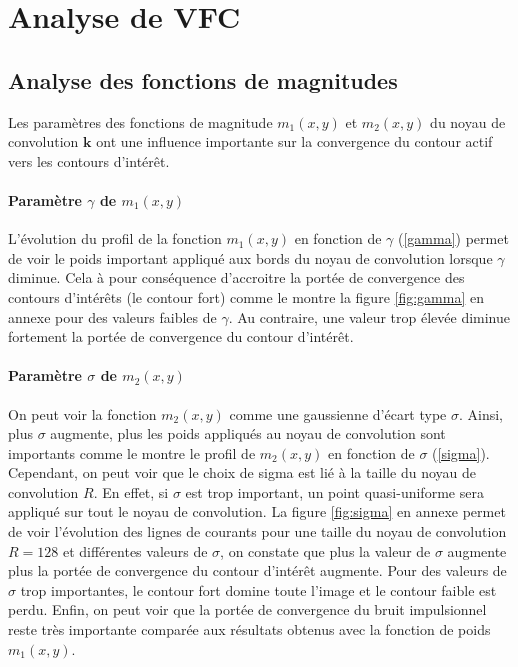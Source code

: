 
\section{Analyse de VFC}
\subsection{Analyse des fonctions de magnitudes}
Les paramètres des fonctions de magnitude $m_1(x,y)$ et $m_2(x,y)$ du noyau de convolution $\mathbf{k}$ ont une influence importante sur la convergence du contour actif vers les contours d'intérêt.

\paragraph*{Paramètre $\gamma$ de $m_1(x,y)$}
L'évolution du profil de la fonction $m_1(x,y)$ en fonction de $\gamma$ (\ref{gamma}) permet de voir le poids important appliqué aux bords du noyau de convolution lorsque $\gamma$ diminue. Cela à pour conséquence d'accroitre la portée de convergence des contours d'intérêts (le contour fort) comme le montre la figure \ref{fig:gamma} en annexe pour des valeurs faibles de $\gamma$. Au contraire, une valeur trop élevée diminue fortement la portée de convergence du contour d'intérêt. 

\paragraph*{Paramètre $\sigma$ de $m_2(x,y)$}
On peut voir la fonction $m_2(x,y)$ comme une gaussienne d'écart type $\sigma$. Ainsi, plus $\sigma$ augmente, plus les poids appliqués au noyau de convolution sont importants comme le montre le profil de $m_2(x,y)$ en fonction de $\sigma$ (\ref{sigma}). Cependant, on peut voir que le choix de sigma est lié à la taille du noyau de convolution $R$. En effet, si $\sigma$ est trop important, un point quasi-uniforme sera appliqué sur tout le noyau de convolution. La figure \ref{fig:sigma} en annexe permet de voir l'évolution des lignes de courants pour une taille du noyau de convolution $R=128$ et différentes valeurs de $\sigma$, on constate que plus la valeur de $\sigma$ augmente plus la portée de convergence du contour d'intérêt augmente. Pour des valeurs de $\sigma$ trop importantes, le contour fort domine toute l'image et le contour faible est perdu. Enfin, on peut voir que la portée de convergence du bruit impulsionnel reste très importante comparée aux résultats obtenus avec la fonction de poids $m_1(x,y)$.

